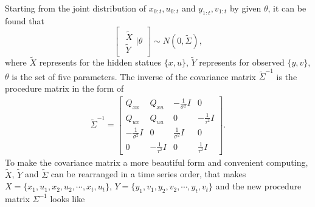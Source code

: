 Starting from the joint distribution of $x_{0:t},u_{0:t}$ and $y_{1:t},v_{1:t}$ by given $\theta$, it can be found that
\begin{equation}\label{jointmatrix}
\begin{bmatrix} \begin{matrix} \tilde{X}\\ \tilde{Y}  \end{matrix} \biggr\rvert \theta \end{bmatrix}
\sim N\left(0, \tilde{\Sigma} \right),
\end{equation}
where $\tilde{X}$ represents for the hidden statues $\{x,u\}$, $\tilde{Y}$ represents for observed $\{y,v\}$, $\theta$ is the set of five parameters.  The inverse of the covariance matrix $\tilde{\Sigma}^{-1}$ is the procedure matrix in the form of
\begin{align*} \tilde{\Sigma}^{-1}=
\begin{bmatrix}
Q_{xx} & Q_{xu} & -\frac{1}{\sigma^2}I & 0\\
Q_{ux} & Q_{uu} & 0 &-\frac{1}{\tau^2}I \\
-\frac{1}{\sigma^2}I & 0 & \frac{1}{\sigma^2}I  & 0\\
 0  &  -\frac{1}{\tau^2}I  & 0 & \frac{1}{\tau^2}I 
\end{bmatrix}.
\end{align*}
To make the covariance matrix a more beautiful form and convenient computing, $\tilde{X}$, $\tilde{Y}$ and $\tilde{\Sigma}$ can be rearranged in a time series order, that makes $X = \{x_1,u_1,x_2,u_2,\cdots, x_t, u_t \}$, $Y = \{y_1,v_1,y_2,v_2,\cdots, y_t, v_t \}$ and the new procedure matrix $\Sigma^{-1}$ looks like 
